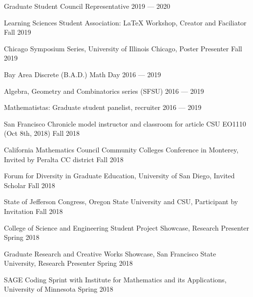  Graduate Student Council Representative	\hfill 2019 --- 2020
 
Learning Sciences Student Association: LaTeX Workshop, Creator and Faciliator	\hfill Fall 2019

Chicago Symposium Series, University of Illinois Chicago, Poster Presenter	\hfill Fall 2019

Bay Area Discrete (B.A.D.) Math Day	\hfill 2016 --- 2019

Algebra, Geometry and Combinatorics series (SFSU) \hfill	2016 --- 2019

Mathematistas: Graduate student panelist, recruiter \hfill  2016 --- 2019

San Francisco Chronicle model instructor and classroom for article CSU EO1110 (Oct 8th, 2018) \hfill Fall 2018

California Mathematics Council Community Colleges Conference in Monterey, Invited by Peralta CC district	\hfill Fall 2018

Forum for Diversity in Graduate Education, University of San Diego, Invited Scholar \hfill	Fall 2018

State of Jefferson Congress, Oregon State University and CSU, Participant by Invitation	\hfill Fall 2018

College of Science and Engineering Student Project Showcase, Research Presenter	\hfill Spring 2018

Graduate Research and Creative Works Showcase, San Francisco State University, Research Presenter	\hfill Spring 2018

SAGE Coding Sprint with Institute for Mathematics and its Applications, University of Minnesota	\hfill Spring 2018



